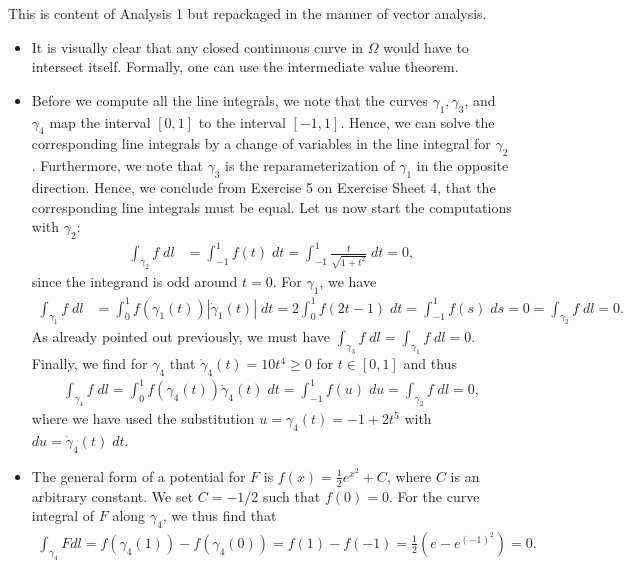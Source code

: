 \documentclass[11pt]{article}
\begin{document}
\begin{solution}
    This is content of Analysis 1 but repackaged in the manner of vector analysis. 
    \begin{itemize}
        \item It is visually clear that any closed continuous curve in $\Omega$ would have to intersect itself.
		Formally, one can use the intermediate value theorem.
        \item Before we compute all the line integrals, we note that the curves $\gamma_1, \gamma_3$, and $\gamma_4$ map the interval $[0, 1]$ to the interval $[-1, 1]$.
        Hence, we can solve the corresponding line integrals by a change of variables in the line integral for $\gamma_2$.
        Furthermore, we note that $\gamma_3$ is the reparameterization of $\gamma_1$ in the opposite direction. Hence, we conclude from Exercise 5 on Exercise Sheet 4,
        that the corresponding line integrals must be equal. Let us now start the computations with $\gamma_2$:
        \begin{align}
            \int_{\gamma_2} f \;dl 
            &= 
            \int_{-1}^1 f(t) \;dt 
            = 
            \int_{-1}^1 \frac{t}{\sqrt{1+t^2}} \;dt 
            = 0,
        \end{align}
        since the integrand is odd around $t = 0$. For $\gamma_1$, we have
        \begin{align}
            \int_{\gamma_1} f \;dl 
            &= 
            \int_{0}^1 f(\gamma_1(t)) |\dot \gamma_1(t)| \;dt 
            = 
            2\int_{0}^1 f(2t - 1) \;dt 
            = \int_{-1}^1 f(s) \;ds = 0 = \int_{\gamma_2} f \;dl = 0.
        \end{align}
        As already pointed out previously, we must have $\int_{\gamma_3} f \;dl = \int_{\gamma_1} f \;dl = 0$. 
        Finally, we find for $\gamma_4$ that $\dot \gamma_4(t) = 10t^4 \geq 0$ for $t \in [0,1]$
        and thus
        \begin{align}
            \int_{\gamma_4} f \;dl 
            = 
            \int_{0}^1 f(\gamma_4(t)) \dot \gamma_4(t) \;dt 
            = 
            \int_{-1}^1 f(u) \;du = \int_{\gamma_2} f \;dl = 0,
        \end{align}
        where we have used the substitution $u = \gamma_4(t) = -1 + 2t^5$ with $du = \dot \gamma_4(t) \;dt$.
        \item The general form of a potential for $F$ is $f(x) = \frac 1 2 e^{x^2} + C$, where $C$ is an arbitrary constant. We set
        $C = -1/2$ such that $f(0) = 0$. For the curve integral of $F$ along $\gamma_4$, we thus find that
        \begin{align}
            \int_{\gamma_4} F dl = f(\gamma_4(1)) - f(\gamma_4(0)) = f(1) - f(-1) = \frac 1 2 (e - e^{(-1)^2}) = 0.
        \end{align}
    \end{itemize}
\end{solution}
\end{document}
